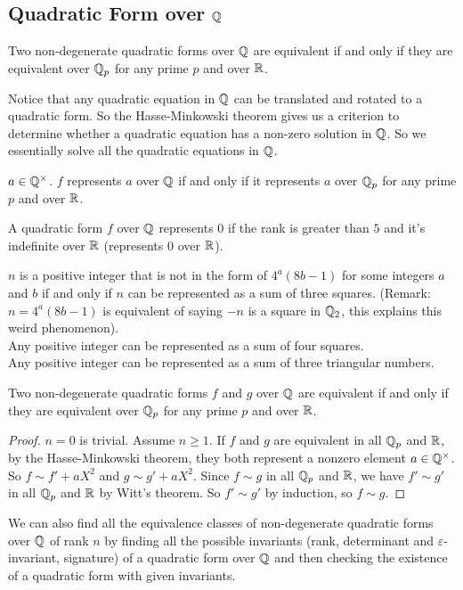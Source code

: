 \documentclass[15pt]{scrartcl}
\begin{document}
\subsection{Quadratic Form over $\mathbb Q$}
\begin{theorem}
    Two non-degenerate quadratic forms over $\mathbb Q$ are equivalent if and only if they are equivalent over $\mathbb Q_p$ for any prime $p$ and over $\mathbb R$.
\end{theorem}
\begin{remark}
    Notice that any quadratic equation in $\mathbb Q$ can be translated and rotated to a quadratic form. So the Hasse-Minkowski theorem gives us a criterion to determine whether a quadratic equation has a non-zero solution in $\mathbb Q$. So we essentially solve all the quadratic equations in $\mathbb Q$. 
\end{remark}
\begin{corollary}
    $a\in \mathbb Q^\times$. $f$ represents $a$ over $\mathbb Q$ if and only if it represents $a$ over $\mathbb Q_p$ for any prime $p$ and over $\mathbb R$.
\end{corollary}
\begin{corollary}
    A quadratic form $f$ over $\mathbb Q$ represents $0$ if the rank is greater than $5$ and it's indefinite over $\mathbb R$ (represents $0$ over $\mathbb R$).
\end{corollary}
\begin{corollary}
    $n$ is a positive integer that is not in the form of $4^a(8b-1)$ for some integers $a$ and $b$ if and only if $n$ can be represented as a sum of three squares. (Remark: $n=4^a(8b-1)$ is equivalent of saying $-n$ is a square in $\mathbb Q_2$, this explains this weird phenomenon).
    \\

    Any positive integer can be represented as a sum of four squares.
    \\

    Any positive integer can be represented as a sum of three triangular numbers.
\end{corollary}
\begin{theorem}
    Two non-degenerate quadratic forms $f$ and $g$ over $\mathbb Q$ are equivalent if and only if they are equivalent over $\mathbb Q_p$ for any prime $p$ and over $\mathbb R$. 
\end{theorem}
\begin{proof}
    $n=0$ is trivial. Assume $n\geq 1$. If $f$ and $g$ are equivalent in all $\mathbb Q_p$ and $\mathbb R$, by the Hasse-Minkowski theorem, they both represent a nonzero element $a\in \mathbb Q^\times$. So $f\sim f'+aX^2$ and $g\sim g'+aX^2$. Since $f\sim g$ in all $\mathbb Q_p$ and $\mathbb R$, we have $f'\sim g'$ in all $\mathbb Q_p$ and $\mathbb R$ by Witt's theorem. So $f'\sim g'$ by induction, so $f\sim g$.
\end{proof}
\begin{remark}
    We can also find all the equivalence classes of non-degenerate quadratic forms over $\mathbb Q$ of rank $n$ by finding all the possible invariants (rank, determinant and $\varepsilon$-invariant, signature) of a quadratic form over $\mathbb Q$ and then checking the existence of a quadratic form with given invariants. 
\end{remark}
\newpage
\end{document}
